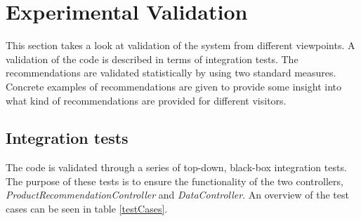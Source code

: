 
\chapter{Experimental Validation} %

\label{Chapter6} %


This section takes a look at validation of the system from different viewpoints. A validation of the code is described in terms of integration tests. The recommendations are validated statistically by using two standard measures. Concrete examples of recommendations are given to provide some insight into what kind of recommendations are provided for different visitors.

\section{Integration tests}
The code is validated through a series of top-down, black-box integration tests. The purpose of these tests is to ensure the functionality of the two controllers, \textit{ProductRecommendationController} and \textit{DataController}. An overview of the test cases can be seen in table \ref{testCases}.

